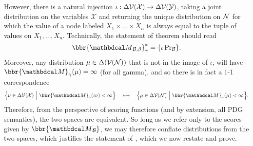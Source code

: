 However, there is a natural injection $\iota: \Delta \mathcal V(\mathcal X) \to \Delta
\mathcal V(\mathcal Y)$, taking a joint distribution on the variables $\mathcal X$ and
returning the unique distribution on $\mathcal N$ for which the value of a node labeled
$X_1 \times \ldots \times X_n$ is always equal to the tuple of values on $X_1,
\ldots, X_n$. Technically, the statement of theorem should read
\[ \bbr{\PDGof{\mathcal B, \beta}}^*_\gamma = \{ \iota \Pr\nolimits_{\mathcal B} \} . \]
Moreover, any distribution $\mu \in \Delta(\mathcal V(\mathcal N))$ that is not in the image of $\iota$, will have $\bbr{\dg M}_\gamma(\mu) = \infty$ (for all gamma), and so there is in fact a 1-1 correspondence 
\[ \Big\{ \nu \in \Delta\V(\mathcal X)~\Big|~ \bbr{\dg M}_\gamma(\iota\nu) < \infty \Big \} \quad\leftrightsquigarrow\quad 
\Big\{ \mu \in \Delta\V(\N)~\Big|~ \bbr{\dg M}_\gamma(\mu) < \infty \Big \}.
\]
Therefore, from the perspective of scoring functions (and by extension, all PDG semantics), the two spaces are equivalent. So long as we refer only to the scores given by $\bbr{\PDGof{\mathcal B}}$, we may therefore conflate distributions from the two spaces,  which justifies the statement of , which we now restate and prove.

